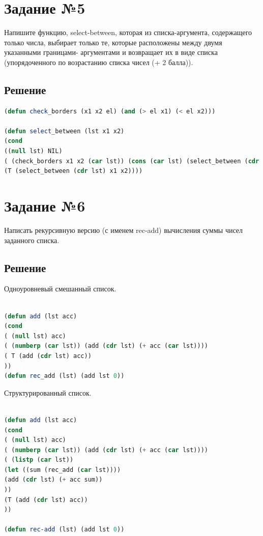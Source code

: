 \documentclass[12pt]{report}
\begin{document}
\section*{Задание №5}
Напишите функцию, select-between, которая из списка-аргумента, содержащего только
числа, выбирает только те, которые расположены между двумя указанными границами-
аргументами и возвращает их в виде списка (упорядоченного по возрастанию списка чисел
(+ 2 балла)).

\subsection*{Решение}
\begin{lstlisting}[label=5,caption=Решение задания №5, language=lisp]
(defun check_borders (x1 x2 el) (and (> el x1) (< el x2)))

(defun select_between (lst x1 x2)
(cond
((null lst) NIL)
( (check_borders x1 x2 (car lst)) (cons (car lst) (select_between (cdr lst) x1 x2)) )
(T (select_between (cdr lst) x1 x2))))

\end{lstlisting}


\section*{Задание №6}
Написать рекурсивную версию (с именем rec-add) вычисления суммы чисел заданного
списка.
\subsection*{Решение}

Одноуровневый смешанный список.
\begin{lstlisting}[label=5,caption=Решение задания №6а, language=lisp]

(defun add (lst acc)
(cond
( (null lst) acc)
( (numberp (car lst)) (add (cdr lst) (+ acc (car lst))))
( T (add (cdr lst) acc))
))
(defun rec_add (lst) (add lst 0))

\end{lstlisting}

Структурированный список.

\begin{lstlisting}[label=5,caption=Решение задания №6б, language=lisp]

(defun add (lst acc)
(cond
( (null lst) acc)
( (numberp (car lst)) (add (cdr lst) (+ acc (car lst))))
( (listp (car lst)) 
(let ((sum (rec_add (car lst))))
(add (cdr lst) (+ acc sum))
))
(T (add (cdr lst) acc))
))

(defun rec-add (lst) (add lst 0))

\end{lstlisting}
\end{document}
